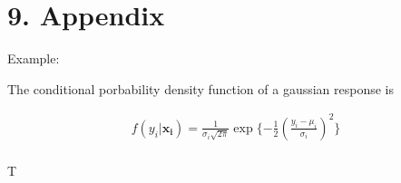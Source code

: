 \documentclass[
]{report}
\begin{document}
\hypertarget{appendix}{%
\chapter{9. Appendix}\label{appendix}}

Example:

The conditional porbability density function of a gaussian response is

\begin{equation}
 \begin{gathered}
  f\left( y_i|\bm{x_i} \right) = \frac{1}{\sigma_i \sqrt{2\pi}} \exp \Bigg\{ { -\frac{1}{2} \left(\frac{y_i - \mu_i}{\sigma_i} \right)^2} \Bigg\} \\
 \end{gathered}
\end{equation}

T
\end{document}
